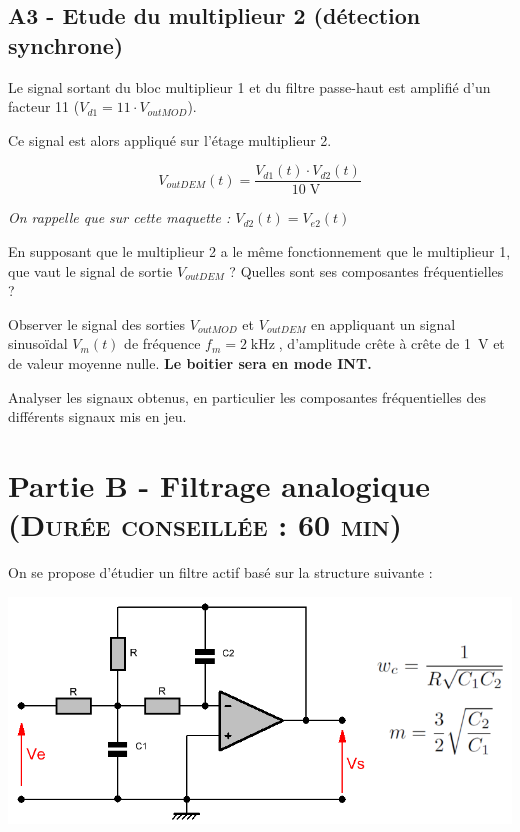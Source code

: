 \documentclass[a4paper,11pt]{article}
\begin{document}
\subsection*{A3 - Etude du multiplieur 2 (détection synchrone)}

Le signal sortant du bloc multiplieur 1 et du filtre passe-haut est amplifié d'un facteur 11 ($V_{d1} = 11 \cdot V_{out MOD}$).

Ce signal est alors appliqué sur l'étage multiplieur 2.

	$$V_{outDEM}(t) = \frac{V_{d1}(t) \cdot V_{d2}(t)}{10\operatorname{V}}$$
	
\textit{On rappelle que sur cette maquette : $V_{d2}(t) = V_{e2}(t)$}

\Real En supposant que le multiplieur 2 a le même fonctionnement que le multiplieur 1, que vaut le signal de sortie $V_{out DEM}$ ? Quelles sont ses composantes fréquentielles ?

\Real Observer le signal des sorties $V_{out MOD}$ et $V_{out DEM}$ en appliquant un signal sinusoïdal $V_{m}(t)$ de fréquence $f_m = 2\operatorname{kHz}$, d'amplitude crête à crête de 1~V et de valeur moyenne nulle. \textbf{Le boitier sera en mode INT.}

\Real Analyser les signaux obtenus, en particulier les composantes fréquentielles des différents signaux mis en jeu.


\newpage
\section{Partie B - Filtrage analogique \textsc{\normalsize(Durée conseillée : 60 min)}}

On se propose d'étudier un filtre actif basé sur la structure suivante :

\begin{center}
\includegraphics[scale=0.75]{images/rauch_help.png}
\end{center}
\end{document}

